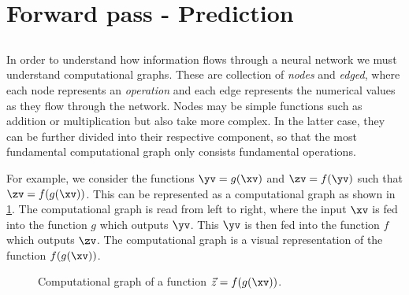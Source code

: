 %
%

\section{Forward pass - Prediction}
    \subsection{}
    In order to understand how information flows through a neural network we must understand computational graphs. These are collection of \textit{nodes} and \textit{edged}, where each node represents an \textit{operation} and each edge represents the numerical values as they flow through the network. Nodes may be simple functions such as addition or multiplication but also take more complex. In the latter case, they can be further divided into their respective component, so that the most fundamental computational graph only consists fundamental operations. 

    For example, we consider the functions $\yv = g(\xv)$ and $\zv = f(\yv)$ such that $\zv = f(g(\xv))$. This can be represented as a computational graph as shown in \cref{fig:ML:NN:comp_graph_example}. The computational graph is read from left to right, where the input $\xv$ is fed into the function $g$ which outputs $\yv$. This $\yv$ is then fed into the function $f$ which outputs $\zv$. The computational graph is a visual representation of the function $f(g(\xv))$.

    \begin{figure}[h!]
        \centering
        
        \caption{Computational graph of a function $\vec{z} = f(g(\xv))$.}
        \label{fig:ML:NN:comp_graph_example}
    \end{figure}


